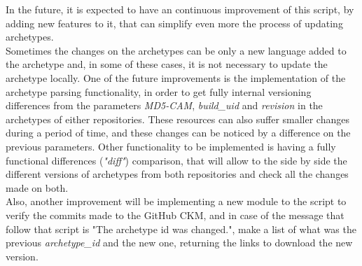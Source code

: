 \documentclass[mim_thesis.tex]{subfiles}
\begin{document}
In the future, it is expected to have an continuous improvement of this script, by adding new features to it, that can simplify even more the process of updating archetypes. \\

Sometimes the changes on the archetypes can be only a new language added to the archetype and, in some of these cases, it is not necessary to update the archetype locally. One of the future improvements is the implementation of the archetype parsing functionality, in order to get fully internal versioning differences from the parameters \textit{MD5-CAM}, \textit{build\_uid} and \textit{revision} in the archetypes of either repositories. These resources can also suffer smaller changes during a period of time, and these changes can be noticed by a difference on the previous parameters. Other functionality to be implemented is having a fully functional differences (\textit{"diff"}) comparison, that will allow to the side by side the different versions of archetypes from both repositories and check all the changes made on both. \\

Also, another improvement will be implementing a new module to the script to verify the commits made to the GitHub CKM, and in case of the message that follow that script is "The archetype id was changed.", make a list of what was the previous \textit{archetype\_id} and the new one, returning the links to download the new version.
\end{document}
